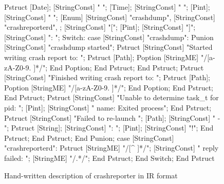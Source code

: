 \begin{figure}
\begin{code}
Pstruct
  [Date];
  [StringConst] " ";
  [Time];
  [StringConst] " ";
  [Pint];
  [StringConst] " ";
  [Enum] {[StringConst] "crashdump", 
          [StringConst] "crashreporterd", };
  [StringConst] "[";
  [Pint];
  [StringConst] "]";
  [StringConst] ": ";
  Switch:
  case [StringConst] "crashdump":
    Punion
      [StringConst] "crashdump started";
      Pstruct
        [StringConst] "Started writing crash 
                       report to: ";
        Pstruct
          [Path];
          Poption
            [StringME] "/[a-zA-Z0-9. ]*/";
          End Poption;
        End Pstruct;
      End Pstruct;
      Pstruct
        [StringConst] "Finished writing crash 
                       report to: ";
        Pstruct
          [Path];
          Poption
            [StringME] "/[a-zA-Z0-9. ]*/";
          End Poption;
        End Pstruct;
      End Pstruct;
      Pstruct
        [StringConst] "Unable to determine 
                       task_t for pid: ";
        [Pint];
        [StringConst] " name: Exited process";
      End Pstruct;
      Pstruct
        [StringConst] "Failed to re-launch ";
        [Path];
        [StringConst] " - ";
        Pstruct
                [String];
                [StringConst] ": ";
                [Pint];
                [StringConst] "!";
        End Pstruct;
      End Pstruct;
    End Punion;
  case [StringConst] "crashreporterd":
    Pstruct
      [StringME] "/[^ ]*/";
      [StringConst] " reply failed: ";
      [StringME] "/.*/";
    End Pstruct;
  End Switch;
End Pstruct
\end{code} 
\caption{Hand-written description of crashreporter in IR format}
\label{fig:crashreporter:ir}
\end{figure}
